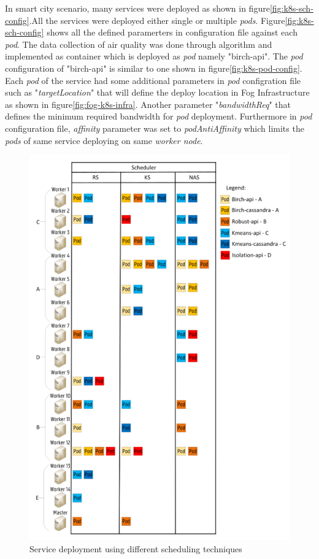 In smart city scenario, many services were deployed as shown in figure\ref{fig:k8s-sch-config}.All the services were deployed either single or multiple \emph{pods}. Figure\ref{fig:k8s-sch-config} shows all the defined paramerters in configuration file against each \emph{pod}. The data collection of air quality was done through algorithm and implemented as container which is deployed as \emph{pod} namely "birch-api"\cite{Santos2019}. The \emph{pod} configuration of "birch-api" is similar to one shown in figure\ref{fig:k8s-pod-config}. Each \emph{pod} of the service  had some additional parameters in \emph{pod} configration file such as "\emph{targetLocation}" that will define the deploy location in Fog Infrastructure as shown in figure\ref{fig:fog-k8s-infra}. Another parameter "\emph{bandwidthReq}" that defines the minimum required bandwidth for \emph{pod} deployment. Furthermore in \emph{pod} configuration file, \emph{affinity} parameter was set to \emph{podAntiAffinity} which limits the \emph{pods} of same service deploying on same \emph{worker node}\cite{Santos2019}.
\begin{figure}
  \centering
  \includegraphics[width=\linewidth]{figures/mlcn-k8s-service-prov.pdf}
  \caption{Service deployment using different scheduling techniques\cite{Santos2019}}
  \label{fig:k8s-service}
\end{figure}
